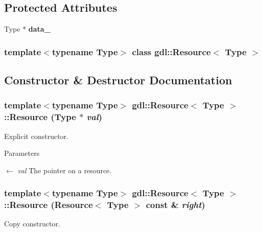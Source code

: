 \subsection*{Protected Attributes}
\begin{DoxyCompactItemize}
\item 
\hypertarget{classgdl_1_1Resource_acfc41dc044277eff21791ff867078989}{
Type $\ast$ {\bfseries data\_\-}}
\label{classgdl_1_1Resource_acfc41dc044277eff21791ff867078989}

\end{DoxyCompactItemize}
\subsubsection*{template$<$typename Type$>$ class gdl::Resource$<$ Type $>$}



\subsection{Constructor \& Destructor Documentation}
\hypertarget{classgdl_1_1Resource_a149a477edeec7571d7664ac6be21f3ce}{
\subsubsection[{Resource}]{\setlength{\rightskip}{0pt plus 5cm}template$<$typename Type$>$ {\bf gdl::Resource}$<$ Type $>$::{\bf Resource} (Type $\ast$ {\em val})}}
\label{classgdl_1_1Resource_a149a477edeec7571d7664ac6be21f3ce}
Explicit constructor.


\begin{DoxyParams}{Parameters}
\item[\mbox{$\leftarrow$} {\em val}]The pointer on a resource. \end{DoxyParams}
\hypertarget{classgdl_1_1Resource_a2110d7edf4e2864a70688a4279480e43}{
\subsubsection[{Resource}]{\setlength{\rightskip}{0pt plus 5cm}template$<$typename Type$>$ {\bf gdl::Resource}$<$ Type $>$::{\bf Resource} ({\bf Resource}$<$ Type $>$ const \& {\em right})}}
\label{classgdl_1_1Resource_a2110d7edf4e2864a70688a4279480e43}
Copy constructor.



